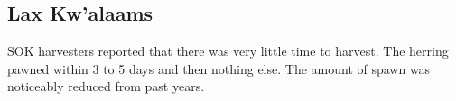 \subsection{Lax Kw'alaams}

SOK harvesters reported that there was very little time to harvest.
The herring pawned within 3 to 5 days and then nothing else.
The amount of spawn was noticeably reduced from past years.

